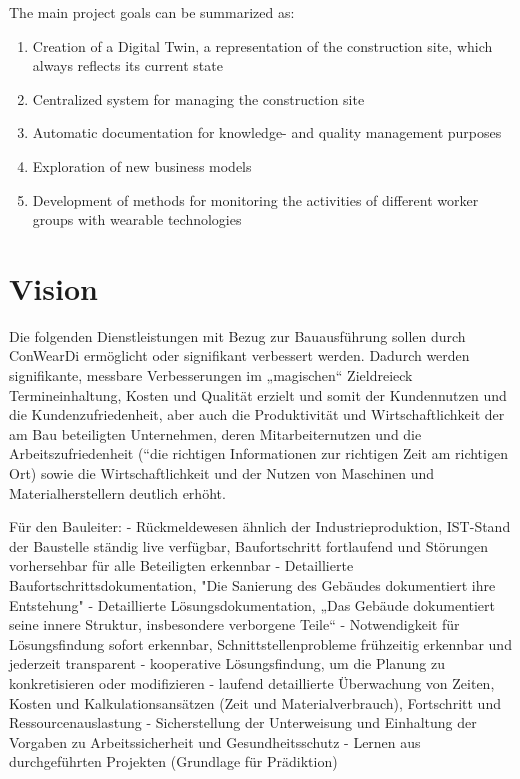
The main project goals can be summarized as:
\begin{enumerate}
  \item Creation of a Digital Twin, a representation of the construction site, which always reflects its current state 
  \item Centralized system for managing the construction site
  \item Automatic documentation for knowledge- and quality management purposes
  \item Exploration of new business models
  \item Development of methods for monitoring the activities of different worker groups with wearable technologies
\end{enumerate}


\section{Vision}

Die folgenden Dienstleistungen mit Bezug zur Bauausführung sollen durch ConWearDi ermöglicht oder signifikant verbessert werden. Dadurch werden signifikante, messbare Verbesserungen im „magischen“ Zieldreieck Termineinhaltung, Kosten und Qualität erzielt und somit der  Kundennutzen und die Kundenzufriedenheit, aber auch die Produktivität und Wirtschaftlichkeit der am Bau beteiligten Unternehmen, deren Mitarbeiternutzen und die Arbeitszufriedenheit (“die richtigen Informationen zur richtigen Zeit am richtigen Ort) sowie die Wirtschaftlichkeit und der Nutzen von Maschinen und Materialherstellern deutlich erhöht.

Für den Bauleiter:
- Rückmeldewesen ähnlich der Industrieproduktion, IST-Stand der Baustelle ständig live verfügbar, Baufortschritt fortlaufend und Störungen vorhersehbar für alle Beteiligten erkennbar
- Detaillierte Baufortschrittsdokumentation, "Die Sanierung des Gebäudes dokumentiert ihre Entstehung"
- Detaillierte Lösungsdokumentation, „Das Gebäude dokumentiert seine innere Struktur, insbesondere verborgene Teile“
- Notwendigkeit für Lösungsfindung sofort erkennbar, Schnittstellenprobleme frühzeitig erkennbar und jederzeit transparent
- kooperative Lösungsfindung, um die  Planung zu  konkretisieren  oder  modifizieren 
- laufend detaillierte Überwachung von Zeiten, Kosten und Kalkulationsansätzen (Zeit und Materialverbrauch), Fortschritt und Ressourcenauslastung
- Sicherstellung der Unterweisung und Einhaltung der Vorgaben zu Arbeitssicherheit und Gesundheitsschutz
- Lernen aus durchgeführten Projekten (Grundlage für Prädiktion) 


